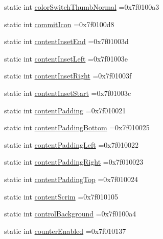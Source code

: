 \begin{DoxyCompactItemize}
static int \hyperlink{classandroid_1_1support_1_1v7_1_1recyclerview_1_1R_1_1attr_a63b367a27143e06ba487c59d338837b3}{color\+Switch\+Thumb\+Normal} =0x7f0100a3
\item 
static int \hyperlink{classandroid_1_1support_1_1v7_1_1recyclerview_1_1R_1_1attr_a4a9d73691021aec95bdf438cb664df4d}{commit\+Icon} =0x7f0100d8
\item 
static int \hyperlink{classandroid_1_1support_1_1v7_1_1recyclerview_1_1R_1_1attr_ac4b8375e0931677457a5c96243d663b5}{content\+Inset\+End} =0x7f01003d
\item 
static int \hyperlink{classandroid_1_1support_1_1v7_1_1recyclerview_1_1R_1_1attr_a6f74b21e606ee8a2ac8e9a504ca6eff0}{content\+Inset\+Left} =0x7f01003e
\item 
static int \hyperlink{classandroid_1_1support_1_1v7_1_1recyclerview_1_1R_1_1attr_a3496651078a82f9d2db8bd0bac943866}{content\+Inset\+Right} =0x7f01003f
\item 
static int \hyperlink{classandroid_1_1support_1_1v7_1_1recyclerview_1_1R_1_1attr_a61c7b9100bb36195d7ad5a2ea90586b6}{content\+Inset\+Start} =0x7f01003c
\item 
static int \hyperlink{classandroid_1_1support_1_1v7_1_1recyclerview_1_1R_1_1attr_a39a2e38477ef0d9f1e02fb872fe85cfa}{content\+Padding} =0x7f010021
\item 
static int \hyperlink{classandroid_1_1support_1_1v7_1_1recyclerview_1_1R_1_1attr_a2194e3c487011b405bf6f88be71c0119}{content\+Padding\+Bottom} =0x7f010025
\item 
static int \hyperlink{classandroid_1_1support_1_1v7_1_1recyclerview_1_1R_1_1attr_a6e40ff5a431c75e53d28f9aa45683fc9}{content\+Padding\+Left} =0x7f010022
\item 
static int \hyperlink{classandroid_1_1support_1_1v7_1_1recyclerview_1_1R_1_1attr_ad558e2ba42003985945d4cdf8f9d1ea4}{content\+Padding\+Right} =0x7f010023
\item 
static int \hyperlink{classandroid_1_1support_1_1v7_1_1recyclerview_1_1R_1_1attr_a9866843ed1b48c21614c5d076d85c4c3}{content\+Padding\+Top} =0x7f010024
\item 
static int \hyperlink{classandroid_1_1support_1_1v7_1_1recyclerview_1_1R_1_1attr_ae5970d35212d899f503250d67ca67181}{content\+Scrim} =0x7f010105
\item 
static int \hyperlink{classandroid_1_1support_1_1v7_1_1recyclerview_1_1R_1_1attr_a732ac653dc8ae1cdfa2a2439e2497fdc}{control\+Background} =0x7f0100a4
\item 
static int \hyperlink{classandroid_1_1support_1_1v7_1_1recyclerview_1_1R_1_1attr_a673510ecde835bfedc453d79a5464b7b}{counter\+Enabled} =0x7f010137

\end{DoxyCompactItemize}
